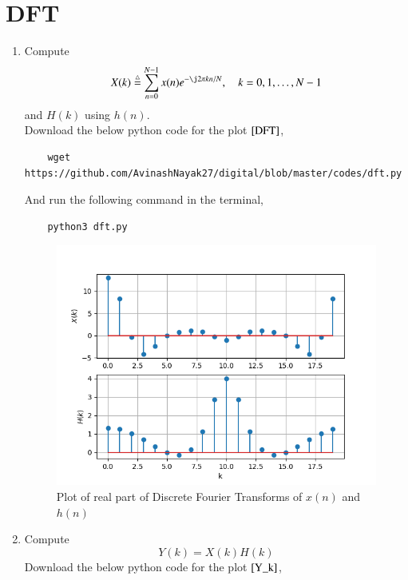 \documentclass[journal,12pt,twocolumn]{IEEEtran}
\renewcommand\thesection{\arabic{section}}
\begin{document}
    \section{DFT}
    \begin{enumerate}[label=\thesection.\arabic*]
    \item
    Compute
    \begin{equation}
    X(k) \define \sum _{n=0}^{N-1}x(n) e^{-\j2\pi kn/N}, \quad k = 0,1,\dots, N-1
    \end{equation}
    and $H(k)$ using $h(n)$.\\
    \solution Download the below python code for the plot $\ref{DFT}$,
    \begin{lstlisting}
    wget  https://github.com/AvinashNayak27/digital/blob/master/codes/dft.py
    \end{lstlisting}
    And run the following command in the terminal,
    \begin{lstlisting}
    python3 dft.py
    \end{lstlisting}
    \begin{figure}[!h]
      \includegraphics[width = \columnwidth]{figs/dft.png}
      \centering
      \caption{Plot of real part of Discrete Fourier Transforms of $x(n)$ and $h(n)$}
      \label{DFT}
    \end{figure}
      \item Compute 
    \begin{equation}
    Y(k) = X(k)H(k)
    \end{equation}
     \solution Download the below python code for the plot $\ref{Y_k}$,
      \begin{lstlisting}

\end{lstlisting}
\end{enumerate}
\end{document}
